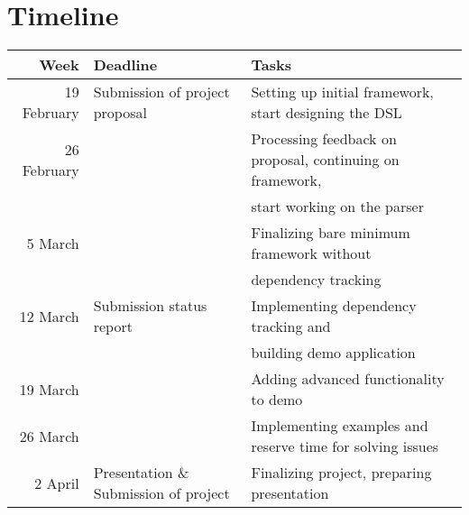 \documentclass{article}
\begin{document}
	\section{Timeline}
		\begin{tabular}{|r|l|l|} \hline
			Week & Deadline &Tasks  \\ \hline \hline
			19 February & Submission of project proposal & Setting up initial framework, start designing the DSL\\ \hline
			26 February &  & Processing feedback on proposal, continuing on framework,\\
			 & & start working on the parser \\ \hline
			5 March & & Finalizing bare minimum framework without \\
			 & & dependency tracking \\ \hline
			12 March & Submission status report & Implementing dependency tracking and \\
			 & & building demo application\\ \hline
			19 March & & Adding advanced functionality to demo\\ \hline
			26 March & & Implementing examples and reserve time for solving issues\\ \hline
			2 April & Presentation \& Submission of project & Finalizing project, preparing presentation\\ \hline
			
		\end{tabular}
	
\end{document}
